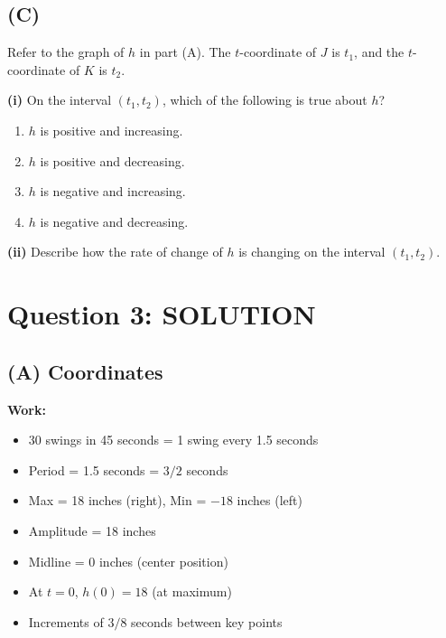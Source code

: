 \documentclass[11pt]{article}
\begin{document}
\subsection*{(C)}
Refer to the graph of $h$ in part (A). The $t$-coordinate of $J$ is $t_1$, and the $t$-coordinate of $K$ is $t_2$.

\textbf{(i)} On the interval $(t_1, t_2)$, which of the following is true about $h$?

\begin{enumerate}[label=\alph*., leftmargin=1.5cm]
    \item $h$ is positive and increasing.
    \item $h$ is positive and decreasing.
    \item $h$ is negative and increasing.
    \item $h$ is negative and decreasing.
\end{enumerate}

\vspace{0.5cm}
\textbf{(ii)} Describe how the rate of change of $h$ is changing on the interval $(t_1, t_2)$.

\newpage

\section*{Question 3: SOLUTION}

\subsection*{(A) Coordinates}

\textbf{Work:}
\begin{itemize}[noitemsep]
    \item 30 swings in 45 seconds = 1 swing every 1.5 seconds
    \item Period = 1.5 seconds = $3/2$ seconds
    \item Max = 18 inches (right), Min = $-18$ inches (left)
    \item Amplitude = 18 inches
    \item Midline = 0 inches (center position)
    \item At $t = 0$, $h(0) = 18$ (at maximum)
    \item Increments of $3/8$ seconds between key points
\end{itemize}
\end{document}
